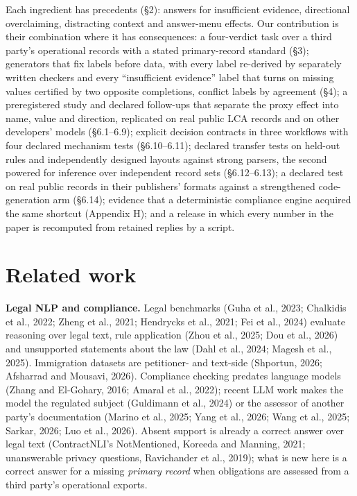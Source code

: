 \documentclass[10pt,twocolumn]{article}
\begin{document}
Each ingredient has precedents (§2): answers for insufficient evidence, directional overclaiming, distracting context and answer-menu effects. Our contribution is their combination where it has consequences: a four-verdict task over a third party's operational records with a stated primary-record standard (§3); generators that fix labels before data, with every label re-derived by separately written checkers and every ``insufficient evidence'' label that turns on missing values certified by two opposite completions, conflict labels by agreement (§4); a preregistered study and declared follow-ups that separate the proxy effect into name, value and direction, replicated on real public LCA records and on other developers' models (§6.1–6.9); explicit decision contracts in three workflows with four declared mechanism tests (§6.10–6.11); declared transfer tests on held-out rules and independently designed layouts against strong parsers, the second powered for inference over independent record sets (§6.12–6.13); a declared test on real public records in their publishers' formats against a strengthened code-generation arm (§6.14); evidence that a deterministic compliance engine acquired the same shortcut (Appendix H); and a release in which every number in the paper is recomputed from retained replies by a script.

\section{Related work}\label{sec:2}
\textbf{Legal NLP and compliance.} Legal benchmarks (Guha et al., 2023; Chalkidis et al., 2022; Zheng et al., 2021; Hendrycks et al., 2021; Fei et al., 2024) evaluate reasoning over legal text, rule application (Zhou et al., 2025; Dou et al., 2026) and unsupported statements about the law (Dahl et al., 2024; Magesh et al., 2025). Immigration datasets are petitioner- and text-side (Shportun, 2026; Afsharrad and Mousavi, 2026). Compliance checking predates language models (Zhang and El-Gohary, 2016; Amaral et al., 2022); recent LLM work makes the model the regulated subject (Guldimann et al., 2024) or the assessor of another party's documentation (Marino et al., 2025; Yang et al., 2026; Wang et al., 2025; Sarkar, 2026; Luo et al., 2026). Absent support is already a correct answer over legal text (ContractNLI's NotMentioned, Koreeda and Manning, 2021; unanswerable privacy questions, Ravichander et al., 2019); what is new here is a correct answer for a missing \emph{primary record} when obligations are assessed from a third party's operational exports.
\end{document}
